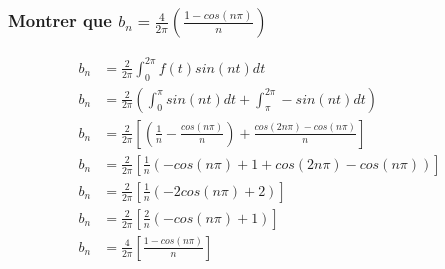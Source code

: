 \documentclass[a4paper,10pt]{report}
\begin{document}
\subsubsection{Montrer que $b_n = \frac{4}{2\pi}(\frac{1-cos(n\pi)}{n})$}
\begin{align*}
b_n &= \frac{2}{2\pi} \int_{0}^{2\pi} f(t) sin(nt) dt\\
b_n &= \frac{2}{2\pi} (\int_{0}^{\pi} sin(nt) dt + \int_{\pi}^{2\pi} -sin(nt) dt)\\
b_n &= \frac{2}{2\pi} [(\frac{1}{n} - \frac{cos(n\pi)}{n}) + \frac{cos(2n\pi) - cos(n\pi)}{n}]\\
b_n &= \frac{2}{2\pi} [\frac{1}{n} (-cos(n\pi) + 1 + cos(2n\pi) - cos(n\pi))]\\
b_n &= \frac{2}{2\pi} [\frac{1}{n} (-2cos(n\pi) + 2)]\\
b_n &= \frac{2}{2\pi} [\frac{2}{n} (-cos(n\pi) + 1)]\\
b_n &= \frac{4}{2\pi} [\frac{1 - cos(n\pi)}{n}]
\end{align*}
\end{document}
